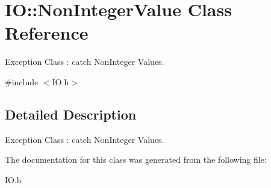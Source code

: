 \hypertarget{classIO_1_1NonIntegerValue}{}\section{IO\+:\+:Non\+Integer\+Value Class Reference}
\label{classIO_1_1NonIntegerValue}


Exception Class \+: catch Non\+Integer Values.  




{\ttfamily \#include $<$I\+O.\+h$>$}



\subsection{Detailed Description}
Exception Class \+: catch Non\+Integer Values. 

The documentation for this class was generated from the following file\+:\begin{DoxyCompactItemize}
\item 
I\+O.\+h\end{DoxyCompactItemize}
